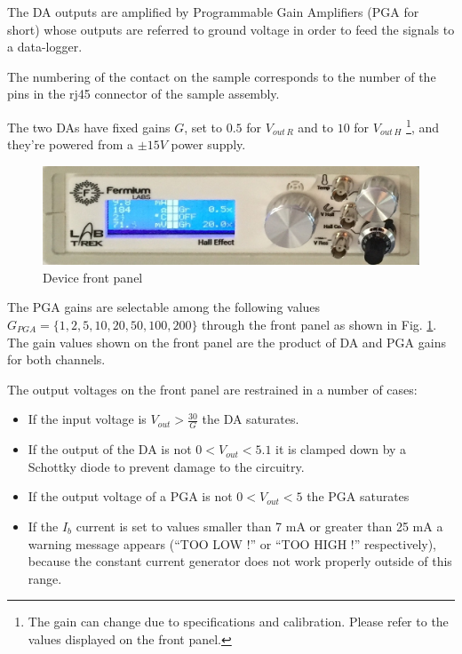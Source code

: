 \documentclass[]{book}
\providecommand{\tightlist}{%
  \setlength{\itemsep}{0pt}\setlength{\parskip}{0pt}}
\let\rmarkdownfootnote\footnote%
\def\footnote{\protect\rmarkdownfootnote}
\begin{document}
The DA outputs are amplified by Programmable Gain Amplifiers (PGA for
short) whose outputs are referred to ground voltage in order to feed the
signals to a data-logger.

The numbering of the contact on the sample corresponds to the number of
the pins in the rj45 connector of the sample assembly.

The two DAs have fixed gains \(G\), set to \(0.5\) for \(V_{out \, R}\)
and to \(10\) for \(V_{out \, H}\) \footnote{The gain can change due to
  specifications and calibration. Please refer to the values displayed
  on the front panel.}, and they're powered from a \(\pm 15V\) power
supply.

\begin{figure}

{\centering \includegraphics[width=0.65\linewidth]{Assets/Figures/imageFrontPanel0} 

}

\caption{Device front panel}\label{fig:frontPanel}
\end{figure}

The PGA gains are selectable among the following values
\(G_{ PGA}= \{ 1,2,5,10,20,50,100,200\}\) through the front panel as
shown in Fig. \ref{fig:frontPanel}. The gain values shown on the front
panel are the product of DA and PGA gains for both channels.

The output voltages on the front panel are restrained in a number of
cases:

\begin{itemize}
\tightlist
\item
  If the input voltage is \(V_{out} > \frac{30}{G}\) the DA saturates.
\item
  If the output of the DA is not \(0 < V_{out} < 5.1\) it is clamped
  down by a Schottky diode to prevent damage to the circuitry.
\item
  If the output voltage of a PGA is not \(0 < V_{out} < 5\) the PGA
  saturates
\item
  If the \(I_b\) current is set to values smaller than 7 mA or greater
  than 25 mA a warning message appears (``TOO LOW !'' or ``TOO HIGH !''
  respectively), because the constant current generator does not work
  properly outside of this range.
\end{itemize}
\end{document}
